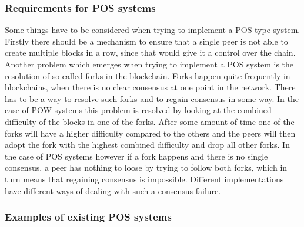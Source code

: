 \subsubsection{Requirements for POS systems}

Some things have to be considered when trying to implement a POS type system. Firstly there should be a mechanism to ensure that a single peer is not able to create multiple blocks in a row, since
that would give it a control over the chain. Another problem which emerges when trying to implement a POS system is the resolution of so called forks in the blockchain. Forks happen quite frequently
in blockchains, when there is no clear consensus at one point in the network. There has to be a way to resolve such forks and to regain consensus in some way. In the case of POW systems this problem
is resolved by looking at the combined difficulty of the blocks in one of the forks. After some amount of time one of the forks will have a higher difficulty compared to the others and the peers will
then adopt the fork with the highest combined difficulty and drop all other forks.\cite{url:bitcoin} In the case of POS systems however if a fork happens and there is no single consensus, a peer has
nothing to loose by trying to follow both forks, which in turn means that regaining consensus is impossible. Different implementations have different ways of dealing with such a consensus
failure.\cite{url:pos_impossible}

\subsubsection{Examples of existing POS systems}

